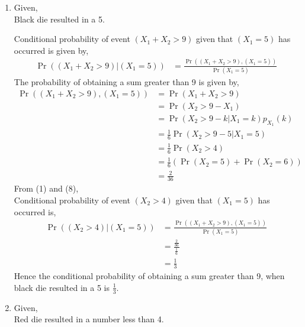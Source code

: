 \documentclass[10pt,column]{article}
\providecommand{\pr}[1]{\ensuremath{\Pr\left(#1\right)}}
\providecommand{\brak}[1]{\ensuremath{\left(#1\right)}}
\begin{document}
\begin{enumerate}
\item 
Given, \\
Black die resulted in a 5. 

Conditional probability of event $(X_1 + X_2 > 9)$ given that $(X_1 = 5)$ has occurred is given by, 
\begin{align}
\Pr{\brak{\brak{X_1 + X_2 > 9}|\brak{X_1=5}}}
&=\frac{\Pr{((X_1 + X_2 > 9),(X_1=5))}}{\Pr{\brak{X_1=5}}}
\end{align}  
The probability of obtaining a sum greater than 9 is given by,
\begin{align}
\Pr\brak{\brak{X_1 + X_2 > 9}, \brak{X_1 = 5}}
&= \pr{X_1 + X_2  > 9} \\
&= \pr{X_2  > 9 -X_1} \\
&= \pr{X_2  > 9 -k | X_1 = k}p_{X_1}(k) \\
&= \frac{1}{6} \pr{X_2  > 9 -5 | X_1 = 5} \\
&= \frac{1}{6} \pr{X_2 > 4} \\
&= \frac{1}{6} (\pr{X_2 = 5} + \pr{X_2 = 6}) \\
&= \frac{2}{36}
\end{align}
From (1) and (8), \\
Conditional probability of event $(X_2 > 4)$ given that $(X_1 = 5)$ has occurred is, 
\begin{align}
\Pr{\brak{\brak{X_2 > 4}|\brak{X_1=5}}}
&=\frac{\Pr{((X_1 + X_2 > 9),(X_1=5))}}{\Pr{\brak{X_1=5}}}\\
&=\frac{\frac{2}{36}}{\frac{1}{6}}\\
&=\frac{1}{3}
\end{align}  
Hence the conditional probability of obtaining a sum greater than 9, when black die resulted in a 5 is $\frac{1}{3}$. 

\item Given, \\
Red die resulted in a number less than 4. 


\end{enumerate}
\end{document}
